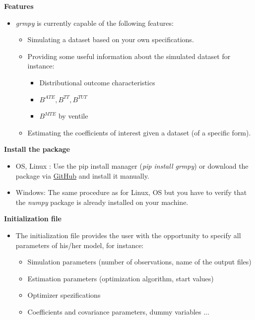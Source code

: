 \begin{frame}
\textbf{Features}

\medskip
\begin{itemize}\setlength\itemsep{1em}
\item \textit{grmpy} is currently capable of the following features:
\begin{itemize}\setlength\itemsep{1em}
  \item Simulating a dataset based on your own specifications.
  \item Providing some useful information about the simulated dataset for instance:

  \medskip
    \begin{itemize}\setlength\itemsep{1em}
    \item Distributional outcome characteristics
    \item $B^{ATE}, B^{TT}, B^{TUT}$
    \item $B^{MTE}$ by ventile
    \end{itemize}
  \item Estimating the coefficients of interest given a dataset (of a specific form).
\end{itemize}
\end{itemize}

\end{frame}

\begin{frame}
\textbf{Install the package}

\medskip
\begin{itemize}\setlength\itemsep{1em}
\item OS, Linux : Use the pip install manager (\textit{pip install grmpy}) or download the package via \href{https://github.com/OpenSourceEconomics/grmpy}{GitHub} and install it manually.
\item Windows:  The same procedure as for Linux, OS but you have to verify that the \textit{numpy} package is already installed on your machine.
\end{itemize}
\end{frame}

\begin{frame}
\textbf{Initialization file}

\medskip
\begin{itemize}\setlength\itemsep{1em}
\item The initialization file provides the user with the opportunity to specify all parameters of his/her model, for instance:\medskip
  \begin{itemize}\setlength\itemsep{1em}
  \item Simulation parameters (number of observations, name of the output files)
  \item Estimation parameters (optimization algorithm, start values)
  \item Optimizer spezifications
  \item Coefficients and covariance parameters, dummy variables ...
  \end{itemize}
\end{itemize}
\end{frame}

